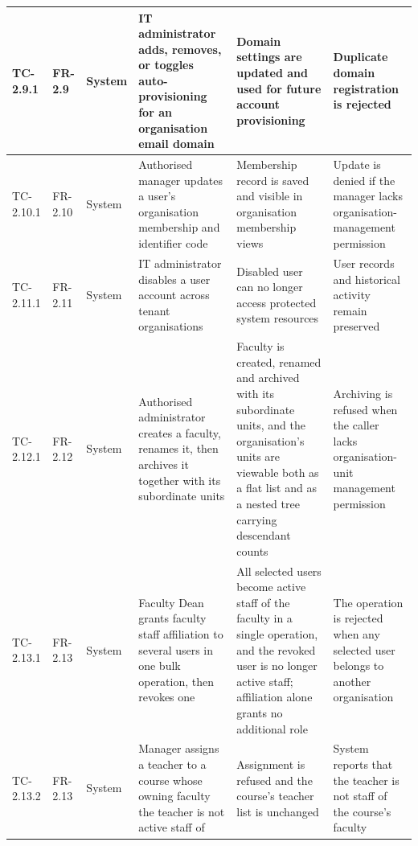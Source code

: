 \begin{longtable}{|>{\centering\arraybackslash}m{}|>{\centering\arraybackslash}m{}|>{\centering\arraybackslash}m{}|m{}|m{}|m{}|}
TC-2.9.1 & FR-2.9 & System & IT administrator adds, removes, or toggles auto-provisioning for an organisation email domain & Domain settings are updated and used for future account provisioning & Duplicate domain registration is rejected \\ \hline

TC-2.10.1 & FR-2.10 & System & Authorised manager updates a user's organisation membership and identifier code & Membership record is saved and visible in organisation membership views & Update is denied if the manager lacks organisation-management permission \\ \hline

TC-2.11.1 & FR-2.11 & System & IT administrator disables a user account across tenant organisations & Disabled user can no longer access protected system resources & User records and historical activity remain preserved \\ \hline

TC-2.12.1 & FR-2.12 & System & Authorised administrator creates a faculty, renames it, then archives it together with its subordinate units & Faculty is created, renamed and archived with its subordinate units, and the organisation's units are viewable both as a flat list and as a nested tree carrying descendant counts & Archiving is refused when the caller lacks organisation-unit management permission \\ \hline

TC-2.13.1 & FR-2.13 & System & Faculty Dean grants faculty staff affiliation to several users in one bulk operation, then revokes one & All selected users become active staff of the faculty in a single operation, and the revoked user is no longer active staff; affiliation alone grants no additional role & The operation is rejected when any selected user belongs to another organisation \\ \hline

TC-2.13.2 & FR-2.13 & System & Manager assigns a teacher to a course whose owning faculty the teacher is not active staff of & Assignment is refused and the course's teacher list is unchanged & System reports that the teacher is not staff of the course's faculty \\ \hline


\end{longtable}
